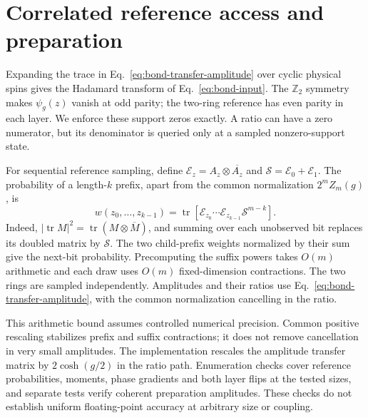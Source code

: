 \section{Correlated reference access and preparation}
\label{app:at-reference}

Expanding the trace in Eq.~\eqref{eq:bond-transfer-amplitude} over cyclic physical spins gives the Hadamard transform of Eq.~\eqref{eq:bond-input}. The $\mathbb Z_2$ symmetry makes $\psi_g(z)$ vanish at odd parity; the two-ring reference has even parity in each layer. We enforce these support zeros exactly. A ratio can have a zero numerator, but its denominator is queried only at a sampled nonzero-support state.

For sequential reference sampling, define $\mathcal E_z=A_z\otimes\overline{A_z}$ and $\mathcal S=\mathcal E_0+\mathcal E_1$. The probability of a length-$k$ prefix, apart from the common normalization $2^m Z_m(g)$, is
\begin{equation}
 w(z_0,\ldots,z_{k-1})=\operatorname{tr}\!\left[\mathcal E_{z_0}\cdots\mathcal E_{z_{k-1}}\mathcal S^{m-k}\right].
\end{equation}
Indeed, $|\operatorname{tr}M|^2=\operatorname{tr}(M\otimes\overline M)$, and summing over each unobserved bit replaces its doubled matrix by $\mathcal S$. The two child-prefix weights normalized by their sum give the next-bit probability. Precomputing the suffix powers takes $O(m)$ arithmetic and each draw uses $O(m)$ fixed-dimension contractions. The two rings are sampled independently. Amplitudes and their ratios use Eq.~\eqref{eq:bond-transfer-amplitude}, with the common normalization cancelling in the ratio.

This arithmetic bound assumes controlled numerical precision. Common positive rescaling stabilizes prefix and suffix contractions; it does not remove cancellation in very small amplitudes. The implementation rescales the amplitude transfer matrix by $2\cosh(g/2)$ in the ratio path. Enumeration checks cover reference probabilities, moments, phase gradients and both layer flips at the tested sizes, and separate tests verify coherent preparation amplitudes. These checks do not establish uniform floating-point accuracy at arbitrary size or coupling.

